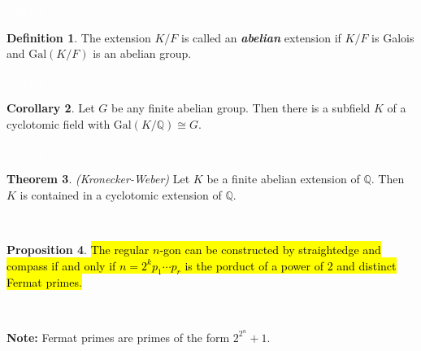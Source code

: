 \documentclass{article}
\theoremstyle{definition}
\newtheorem{thm}{Theorem}[section]
\newtheorem{prop}[thm]{Proposition}
\newtheorem{cor}[thm]{Corollary}
\newtheorem{defn}[thm]{Definition}
\newcommand{\nl}{\textcolor{white}{nothing}}
\newcommand{\Q}{\mathbb{Q}}
\newcommand{\Gal}{\text{Gal}}
\begin{document}
\nl

\begin{defn}
The extension $K/F$ is called an \textit{\textbf{abelian}} extension if $K/F$ is Galois and $\Gal(K/F)$ is an abelian group.
\end{defn}

\nl

\begin{cor}
Let $G$ be any finite abelian group. Then there is a subfield $K$ of a cyclotomic field with $\Gal(K/\Q) \cong G$.
\end{cor}

\nl

\begin{thm}\textit{(Kronecker-Weber)}
Let $K$ be a finite abelian extension of $\Q$. Then $K$ is contained in a cyclotomic extension of $\Q$.
\end{thm}

\nl

\begin{prop}
\hl{The regular $n$-gon can be constructed by straightedge and compass if and only if $n = 2^kp_1\cdots p_r$ is the porduct of a power of 2 and distinct Fermat primes.}
\end{prop}

\nl

\textbf{Note:} Fermat primes are primes of the form $2^{2^n}+1$.
\end{document}
